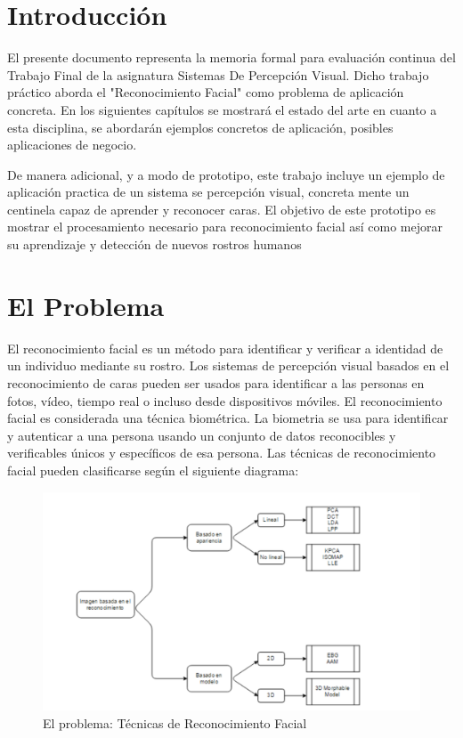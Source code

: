 \documentclass[a4paper,11pt]{book}
\begin{document}


\tableofcontents
\listoffigures

%

%


\chapter{Introducción}

El presente documento representa la memoria formal para evaluación continua del Trabajo Final de la asignatura  Sistemas De Percepción Visual. Dicho trabajo práctico aborda el "Reconocimiento Facial" como problema de aplicación concreta. En los siguientes capítulos se mostrará el estado del arte en cuanto a esta disciplina, se abordarán ejemplos concretos de aplicación, posibles aplicaciones de negocio. 

De manera adicional, y a modo de prototipo, este trabajo incluye un ejemplo de aplicación practica de un sistema se percepción visual, concreta mente un centinela capaz de aprender y reconocer caras. El objetivo de este prototipo  es mostrar el procesamiento necesario para reconocimiento facial así como mejorar su aprendizaje y detección de nuevos rostros humanos

\chapter{El Problema}

El reconocimiento facial es un método para identificar y verificar a identidad de un individuo mediante su rostro. Los sistemas de percepción visual basados en el reconocimiento de caras pueden ser usados para identificar a las personas en fotos, vídeo, tiempo real o incluso desde dispositivos móviles.  El reconocimiento facial es considerada una técnica biométrica. La biometria se usa para identificar y autenticar a una persona usando un conjunto de datos reconocibles y verificables únicos y específicos de esa persona.  Las técnicas de reconocimiento facial pueden clasificarse según el siguiente diagrama: 

\begin{figure}[H]  
\centering 
\includegraphics[scale=0.45]{imagenes/tecnicas.png}
\caption{ El problema: Técnicas de Reconocimiento Facial}  
\end{figure} 
\end{document}
